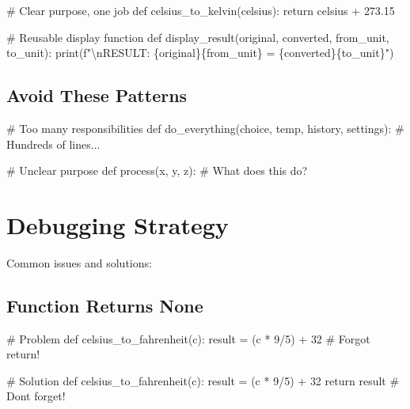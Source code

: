 \documentclass[
  letterpaper,
  DIV=11,
  numbers=noendperiod,
  oneside]{scrreprt}
\newenvironment{Shaded}{}{}
\newcommand{\BuiltInTok}[1]{\textcolor[rgb]{0.84,0.23,0.29}{#1}}
\newcommand{\CharTok}[1]{\textcolor[rgb]{0.01,0.18,0.38}{#1}}
\newcommand{\CommentTok}[1]{\textcolor[rgb]{0.42,0.45,0.49}{#1}}
\newcommand{\ControlFlowTok}[1]{\textcolor[rgb]{0.84,0.23,0.29}{#1}}
\newcommand{\DecValTok}[1]{\textcolor[rgb]{0.00,0.36,0.77}{#1}}
\newcommand{\FloatTok}[1]{\textcolor[rgb]{0.00,0.36,0.77}{#1}}
\newcommand{\KeywordTok}[1]{\textcolor[rgb]{0.84,0.23,0.29}{#1}}
\newcommand{\NormalTok}[1]{\textcolor[rgb]{0.14,0.16,0.18}{#1}}
\newcommand{\OperatorTok}[1]{\textcolor[rgb]{0.14,0.16,0.18}{#1}}
\newcommand{\SpecialCharTok}[1]{\textcolor[rgb]{0.00,0.36,0.77}{#1}}
\newcommand{\SpecialStringTok}[1]{\textcolor[rgb]{0.01,0.18,0.38}{#1}}
\begin{document}
\begin{Shaded}
\begin{Highlighting}[]
\CommentTok{\# Clear purpose, one job}
\KeywordTok{def}\NormalTok{ celsius\_to\_kelvin(celsius):}
    \ControlFlowTok{return}\NormalTok{ celsius }\OperatorTok{+} \FloatTok{273.15}

\CommentTok{\# Reusable display function  }
\KeywordTok{def}\NormalTok{ display\_result(original, converted, from\_unit, to\_unit):}
    \BuiltInTok{print}\NormalTok{(}\SpecialStringTok{f"}\CharTok{\textbackslash{}n}\SpecialStringTok{RESULT: }\SpecialCharTok{\{}\NormalTok{original}\SpecialCharTok{\}\{}\NormalTok{from\_unit}\SpecialCharTok{\}}\SpecialStringTok{ = }\SpecialCharTok{\{}\NormalTok{converted}\SpecialCharTok{\}\{}\NormalTok{to\_unit}\SpecialCharTok{\}}\SpecialStringTok{"}\NormalTok{)}
\end{Highlighting}
\end{Shaded}

\subsection{Avoid These Patterns}\label{avoid-these-patterns}

\begin{Shaded}
\begin{Highlighting}[]
\CommentTok{\# Too many responsibilities}
\KeywordTok{def}\NormalTok{ do\_everything(choice, temp, history, settings):}
    \CommentTok{\# Hundreds of lines...}
    
\CommentTok{\# Unclear purpose}
\KeywordTok{def}\NormalTok{ process(x, y, z):}
    \CommentTok{\# What does this do?}
\end{Highlighting}
\end{Shaded}

\section{Debugging Strategy}\label{debugging-strategy-4}

Common issues and solutions:

\subsection{Function Returns None}\label{function-returns-none}

\begin{Shaded}
\begin{Highlighting}[]
\CommentTok{\# Problem}
\KeywordTok{def}\NormalTok{ celsius\_to\_fahrenheit(c):}
\NormalTok{    result }\OperatorTok{=}\NormalTok{ (c }\OperatorTok{*} \DecValTok{9}\OperatorTok{/}\DecValTok{5}\NormalTok{) }\OperatorTok{+} \DecValTok{32}
    \CommentTok{\# Forgot return!}

\CommentTok{\# Solution  }
\KeywordTok{def}\NormalTok{ celsius\_to\_fahrenheit(c):}
\NormalTok{    result }\OperatorTok{=}\NormalTok{ (c }\OperatorTok{*} \DecValTok{9}\OperatorTok{/}\DecValTok{5}\NormalTok{) }\OperatorTok{+} \DecValTok{32}
    \ControlFlowTok{return}\NormalTok{ result  }\CommentTok{\# Don\textquotesingle{}t forget!}
\end{Highlighting}
\end{Shaded}
\end{document}
